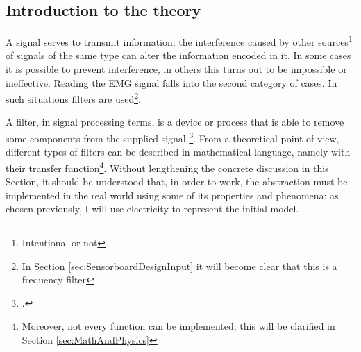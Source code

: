 \documentclass[a4paper, 10pt, final]{article} %
\begin{document}
    \subsection{Introduction to the theory}\label{sec:IntroFiltersSignals}
    A signal serves to transmit information; the interference caused by other sources\footnote{Intentional or not} of signals of the same type can alter the information encoded in it.
    In some cases it is possible to prevent interference, in others this turns out to be impossible or ineffective.
    Reading the EMG signal falls into the second category of cases.
    In such situations filters are used\footnote{In Section \ref{sec:SensorboardDesignInput} it will become clear that this is a frequency filter}.
    
    A filter, in signal processing terms, is a device or process that is able to remove some components from the supplied signal \footcite[]{Filter:Wiki}.
    From a theoretical point of view, different types of filters can be described in mathematical language, namely with their transfer function\footnote{Moreover, not every function can be implemented; this will be clarified in Section \ref{sec:MathAndPhysics}}.
    Without lengthening the concrete discussion in this Section, it should be understood that, in order to work, the abstraction must be implemented in the real world using some of its properties and phenomena: as chosen previously, I will use electricity to represent the initial model.
\end{document}
